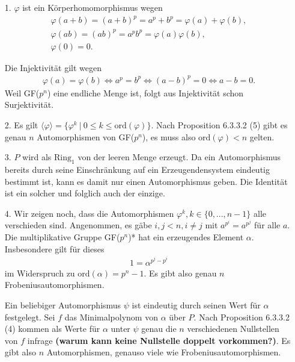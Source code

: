 \begin{solution}
  \begin{itemize}
      \item[1.] $\varphi$ ist ein Körperhomomorphismus wegen
      \begin{align}
          \varphi(a + b) = (a + b)^p = a^p + b^p = \varphi(a) + \varphi(b), \\
          \varphi(ab) = (ab)^p = a^p b^p = \varphi(a) \varphi(b), \\
          \varphi(0) = 0.
      \end{align}

  Die Injektivität gilt wegen
  \begin{align}
      \varphi(a) = \varphi(b) \Longleftrightarrow a^p = b^p \Longleftrightarrow (a-b)^p = 0 \Longleftrightarrow a - b = 0.
  \end{align}
  Weil GF($p^n$) eine endliche Menge ist, folgt aus Injektivität schon Surjektivität.

  \item[2.] Es gilt $\langle\varphi\rangle = \{\varphi^k~|~ 0 \leq k \leq \mathrm{ord}(\varphi)\}.$ Nach Proposition 6.3.3.2 (5) gibt es genau $n$ Automorphismen von GF($p^n$), es muss also $\mathrm{ord}(\varphi) < n$ gelten.

  \item[3.] $P$ wird als $\text{Ring}_1$ von der leeren Menge erzeugt. Da ein Automorphismus bereits durch seine Einschränkung auf ein Erzeugendensystem eindeutig bestimmt ist, kann es damit nur einen Automorphismus geben. Die Identität ist ein solcher und folglich auch der einzige.

  \item[4.] Wir zeigen noch, dass die Automorphismen $\varphi^k, k \in \{0, ..., n-1\}$ alle verschieden sind. Angenommen, es gäbe $i, j < n, i \neq j$ mit $a^{p^i} = a^{p^j}$ für alle $a.$ Die multiplikative Gruppe GF($p^n$)* hat ein erzeugendes Element $\alpha.$ Insbesondere gilt für dieses
  \begin{align}
      1 = \alpha^{p^j - p^i}
  \end{align}
  im Widerspruch zu $\mathrm{ord}(\alpha) = p^n - 1$. Es gibt also genau $n$ Frobeniusautomorphismen.

  Ein beliebiger Automorphismus $\psi$ ist eindeutig durch seinen Wert für $\alpha$ festgelegt. Sei $f$ das Minimalpolynom von $\alpha$ über $P.$ Nach Proposition 6.3.3.2 (4) kommen als Werte für $\alpha$ unter $\psi$ genau die $n$ verschiedenen Nullstellen von $f$ infrage \textbf{(warum kann keine Nullstelle doppelt vorkommen?)}. Es gibt also $n$ Automorphismen, genauso viele wie Frobeniusautomorphismen.
\end{itemize}
\end{solution}

